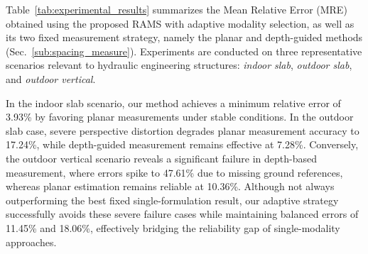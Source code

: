 \documentclass{article}
\newif\ifblind
\begin{document}
Table~\ref{tab:experimental_results} summarizes the Mean Relative Error (MRE) obtained using the proposed RAMS with adaptive modality selection, as well as its two fixed measurement strategy, namely the planar and depth-guided methods (Sec.~\ref{sub:spacing_measure}). Experiments are conducted on three representative scenarios relevant to hydraulic engineering structures: \textit{indoor slab}, \textit{outdoor slab}, and \textit{outdoor vertical}.






\begin{table}[ht]
\centering
\caption{Comparison of MRE across different scenarios.}
\label{tab:experimental_results}
\ifblind
\else
  \vspace{-0.5cm}
\fi
\end{table}


In the indoor slab scenario, our method achieves a minimum relative error of 3.93\% by favoring planar measurements under stable conditions. In the outdoor slab case, severe perspective distortion degrades planar measurement accuracy to 17.24\%, while depth-guided measurement remains effective at 7.28\%. Conversely, the outdoor vertical scenario reveals a significant failure in depth-based measurement, where errors spike to 47.61\% due to missing ground references, whereas planar estimation remains reliable at 10.36\%. Although not always outperforming the best fixed single-formulation result, our adaptive strategy successfully avoids these severe failure cases while maintaining balanced errors of 11.45\% and 18.06\%, effectively bridging the reliability gap of single-modality approaches.
\end{document}

